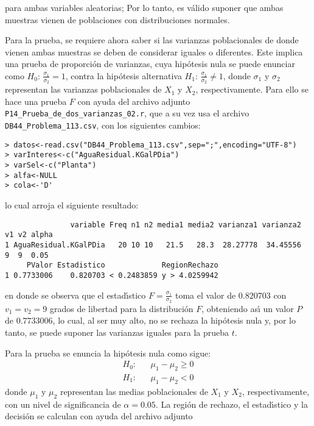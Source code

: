 \begin{solucion}
 para ambas variables aleatorias;
 Por lo tanto, es v\'alido suponer que ambas muestras vienen
 de poblaciones con distribuciones normales.
 \par
 Para la prueba, se requiere ahora saber si las varianzas poblacionales
 de donde vienen ambas muestras se deben de considerar iguales
 o diferentes. Este implica una prueba de proporci\'on de varianzas,
 cuya hip\'otesis nula se puede enunciar como
 $H_0: \, \frac{\sigma_1}{\sigma_2} = 1$, contra la hip\'otesis
 alternativa $H_1: \, \frac{\sigma_1}{\sigma_2} \neq 1$,
 donde $\sigma_1$ y $\sigma_2$ representan las varianzas poblacionales
 de $X_1$ y $X_2$, respectivamente.
 Para ello se hace una prueba $F$ con ayuda del archivo adjunto
 \texttt{P14\_Prueba\_de\_dos\_varianzas\_02.r},
 que a su vez usa el archivo \texttt{DB44\_Problema\_113.csv},
 con los siguientes cambios:
 \begin{verbatim}
> datos<-read.csv("DB44_Problema_113.csv",sep=";",encoding="UTF-8")
> varInteres<-c("AguaResidual.KGalPDia")
> varSel<-c("Planta")
> alfa<-NULL
> cola<-'D'
 \end{verbatim}
 \vspace{-0.5cm}
 lo cual arroja el siguiente resultado:
 \begin{verbatim}
               variable Freq n1 n2 media1 media2 varianza1 varianza2 v1 v2 alpha
1 AguaResidual.KGalPDia   20 10 10   21.5   28.3  28.27778  34.45556  9  9  0.05
     PValor Estadistico             RegionRechazo
1 0.7733006    0.820703 < 0.2483859 y > 4.0259942
 \end{verbatim}
 \vspace{-0.5cm}
 en donde se observa que el estad\'{\i}stico $F=\frac{\sigma_1}{\sigma_2}$
 toma el valor de $0.820703$ con $v_1 = v_2 = 9$ grados
 de libertad para la distribuci\'on $F$,
 obteniendo as\'{\i} un valor $P$ de $0.7733006$,
 lo cual, al ser muy alto, no se rechaza la hip\'otesis nula y,
 por lo tanto, se puede suponer las varianzas iguales para la prueba $t$.
 \par 
 Para la prueba se enuncia la hip\'otesis nula como sigue:
 \begin{eqnarray*}
  H_0: & & \mu_1 - \mu_2 \geq 0 \\
  H_1: & & \mu_1 - \mu_2   <  0
 \end{eqnarray*}
 donde $\mu_1$ y $\mu_2$ representan las medias poblacionales
 de $X_1$ y $X_2$, respectivamente,
 con un nivel de significancia de $\alpha = 0.05$.
 La regi\'on de rechazo, el estad\'{\i}stico y la decisi\'on
 se calculan con ayuda del archivo adjunto

\end{solucion}

